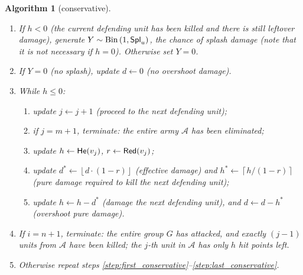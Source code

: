 \documentclass{article}
\newcommand{\ceil}[1]{\left\lceil #1 \right\rceil}
\newcommand{\floor}[1]{\left\lfloor #1 \right\rfloor}
\renewcommand{\leq}{\leqslant}
\newcommand{\overwr}{\leftarrow}
\newcommand{\cA}{\mathcal{A}}
\DeclareMathOperator{\He}{{\sf He}} %
\DeclareMathOperator{\Spl}{{\sf Spl}} %
\DeclareMathOperator{\Red}{{\sf Red}} %
\newtheorem{algorithm}{Algorithm}
\numberwithin{equation}{section}
\begin{document}
\begin{algorithm}[conservative]
\begin{enumerate}
        \item If $h < 0$ (the current defending unit has been killed and there is still leftover damage), generate $Y \sim \mathrm{Bin} \left(1, \Spl _u \right)$, the chance of splash damage (note that it is not necessary if $h = 0$). Otherwise set $Y = 0$.
            
        \item If $Y = 0$ (no splash), update $d \overwr 0$ (no overshoot damage).

        \item While $h \leq 0$:
        \begin{enumerate}
            \item update $j \overwr j + 1$ (proceed to the next defending unit);
            \item if $j = m + 1$, terminate: the entire army $\cA $ has been eliminated;
            \item update $h \overwr \He (v_j)$, $r \overwr \Red (v_j)$;
            \item update $d^* \overwr \floor{d \cdot (1 - r)}$ (effective damage) and $h^* \overwr \ceil{h / (1 - r)}$ (pure damage required to kill the next defending unit);
            \item update $h \overwr h - d^*$ (damage the next defending unit), and $d \overwr d - h^*$ (overshoot pure damage).
        \end{enumerate}

        \item \label{step:last_conservative} If $i = n + 1$, terminate: the entire group $G$ has attacked, and exactly $(j - 1)$ units from $\cA $ have been killed; the $j$-th unit in $\cA $ has only $h$ hit points left.

        \item Otherwise repeat steps \ref{step:first_conservative}--\ref{step:last_conservative}.
    \end{enumerate}
\end{algorithm}
\end{document}
